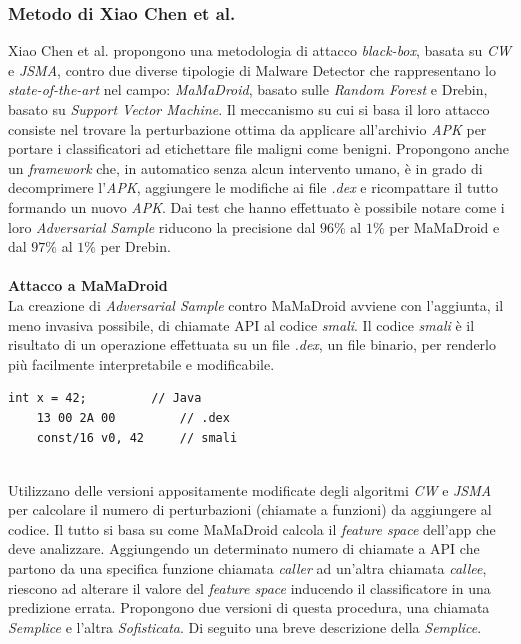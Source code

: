 \subsubsection{Metodo di Xiao Chen et al.}
Xiao Chen et al.\cite{hiv} propongono una metodologia di attacco \textit{black-box}, basata su \textit{CW} e \textit{JSMA}, contro due diverse tipologie di Malware Detector che rappresentano lo \textit{state-of-the-art} nel campo: \textit{MaMaDroid}, basato sulle \textit{Random Forest} e Drebin, basato su \textit{Support Vector Machine}.
Il meccanismo su cui si basa il loro attacco consiste nel trovare la perturbazione ottima da applicare all'archivio \textit{APK} per portare i classificatori ad etichettare file maligni come benigni.
Propongono anche un \textit{framework} che, in automatico senza alcun intervento umano, è in grado di decomprimere l'\textit{APK}, aggiungere le modifiche ai file \textit{.dex} e ricompattare il tutto formando un nuovo \textit{APK}. Dai test che hanno effettuato è possibile notare come i loro \textit{Adversarial Sample} riducono la precisione dal \(96\%\) al \(1\%\) per MaMaDroid\cite{hiv} e dal \(97\%\) al \(1\%\) per Drebin\cite{hiv}.\\
\\
\textbf{Attacco a MaMaDroid}\\
La creazione di \textit{Adversarial Sample} contro MaMaDroid avviene con l'aggiunta, il meno invasiva possibile, di chiamate API al codice \textit{smali}.
Il codice \textit{smali} è il risultato di un operazione effettuata su un file \textit{.dex}, un file binario, per renderlo più facilmente interpretabile e modificabile.\\

\begin{lstlisting}[caption=Esempio di formati dex e smali. La riga 1 rappresenta il codice originale scritto in Java. La riga 2 è il contenuto dello stesso codice compilato in formato dex. La riga 3 è il codice smali ottenuto dalla conversione del file dex.]
    int x = 42;         // Java
    13 00 2A 00         // .dex
    const/16 v0, 42     // smali
\end{lstlisting}
\ \\
Utilizzano delle versioni appositamente modificate degli algoritmi \textit{CW} e \textit{JSMA} per calcolare il numero di perturbazioni (chiamate a funzioni) da aggiungere al codice. %
Il tutto si basa su come MaMaDroid calcola il \textit{feature space} dell'app che deve analizzare. Aggiungendo un determinato numero di chiamate a API che partono da una specifica funzione chiamata \textit{caller} ad un'altra chiamata \textit{callee}, riescono ad alterare il valore del \textit{feature space} inducendo il classificatore in una predizione errata. Propongono due versioni di questa procedura, una chiamata \textit{Semplice} e l'altra \textit{Sofisticata}. Di seguito una breve descrizione della \textit{Semplice}.\\

